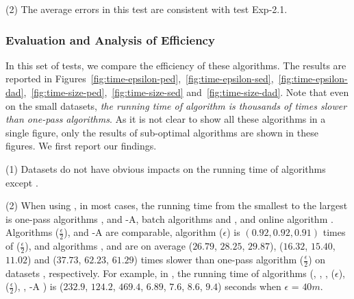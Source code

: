 {{\sstab (2) The average errors in this test are consistent with test Exp-2.1.
}






\subsubsection{Evaluation and {Analysis} of Efficiency}

In this set of tests, we compare the efficiency of these algorithms.
The results are reported in Figures~\ref{fig:time-epsilon-ped},~\ref{fig:time-epsilon-sed},~\ref{fig:time-epsilon-dad},~\ref{fig:time-size-ped},~\ref{fig:time-size-sed} and~\ref{fig:time-size-dad}.
Note that even on the small datasets, \emph{the running time of algorithm \opt  is thousands of times slower than one-pass algorithms}. As it is not clear to show all these algorithms in a single figure, only the results of sub-optimal algorithms are shown in these figures.
We first report our findings.



\sstab (1) {Datasets do not have obvious impacts on the running time of \lsa algorithms except \dagots. }

	


\sstab (2) When using \ped, in most cases, the running time from the smallest to the largest is one-pass algorithms \siped, \operb and {\operb-A}, batch algorithms \tpa and \dpa, and online algorithm \bqsa.
Algorithms \siped($\frac{\epsilon}{2}$), {\operb} and {\operb-A} are comparable, algorithm \siped(${\epsilon}$) is $(0.92, 0.92, 0.91)$ times of \siped($\frac{\epsilon}{2}$), and algorithms \tpa, \dpa and \bqsa are on average
($26.79$, $28.25$, $29.87$), ($16.32$, $15.40$, $11.02$) and ($37.73$, $62.23$, $61.29$)
times slower than one-pass algorithm \siped($\frac{\epsilon}{2}$) on datasets \dSets, respectively.
For example, in \mopsi, the running time of algorithms
(\tpa, \dpa, \bqsa, \siped(${\epsilon}$), \siped($\frac{\epsilon}{2}$), \operb, {\operb-A} ) is ($232.9$, $124.2$, $469.4$, $6.89$, $7.6$, $8.6$, {$9.4$}) seconds when $\epsilon$ = $40m$.



}
